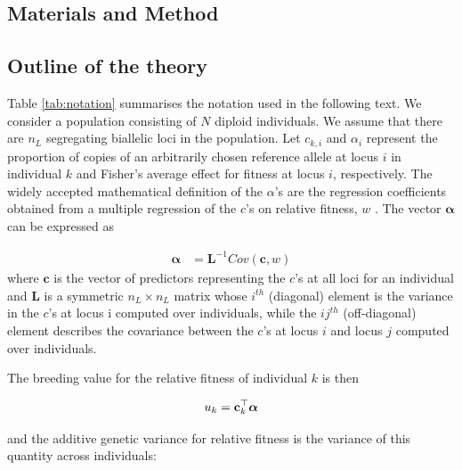 \documentclass[12pt]{article}
\begin{document}
\begin{bibunit}
\section*{Materials and Method}

\subsection*{Outline of the theory}

Table \ref{tab:notation} summarises the notation used in the following text. We consider a population consisting of $N$ diploid individuals. We assume that there are $n_L$ segregating biallelic loci in the population. Let $c_{k,i}$ and $\alpha_i$ represent the proportion of copies of an arbitrarily chosen reference allele at locus $i$ in individual $k$ and Fisher's average effect \citep{Fisher.1941} for fitness at locus $i$, respectively. The widely accepted mathematical definition of the $\alpha$'s are the regression coefficients obtained from a multiple regression of the $c$'s on relative fitness, $w$ \citep{Fisher.1941, Lee.2013}. The vector $\boldsymbol{{\alpha}}$ can be expressed as

\begin{equation} \label{eq1}
\begin{array}{rl} 
\boldsymbol{{\alpha}} &= \textbf{L}^{-1}Cov(\textbf{c}, w) 
\end{array}
\end{equation}
where $\textbf{c}$ is the vector of predictors representing the $c$'s at all loci for an individual and $\textbf{L}$ is a symmetric ${n_L} \times {n_L}$ matrix whose $i^{th}$ (diagonal) element is the variance in the $c$'s at locus i computed over individuals, while the  $ij^{th}$ (off-diagonal) element describes the covariance between the $c$'s at locus $i$ and locus $j$ computed over individuals. 

The breeding value for the relative fitness of individual $k$ is then

$$u_k = {\bf c}^{\top}_{k}\boldsymbol{{\alpha}}$$


and the additive genetic variance for relative fitness is the variance of this quantity across individuals:


\end{bibunit}
\end{document}

